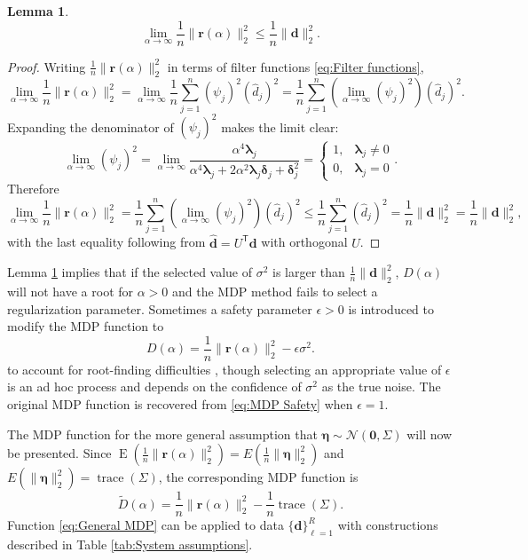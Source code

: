 \documentclass[12pt]{article}
\newcommand{\dVec}{\mathbf{d}}	%
\newcommand{\rVec}{\mathbf{r}}	%
\newcommand{\trans}[1]{{#1}^\mathsf{T}}	%
\DeclareMathOperator{\trace}{trace}		%
\newcommand{\dft}[1]{\widehat{#1}}	%
\newcommand{\regparam}{\alpha}  %
\newcommand{\mfilt}{\psi}
\newcommand{\noise}{\eta}	%
\newcommand{\noiseSD}{\sigma}	%
\newcommand{\noiseVec}{\bm{\noise}}	%
\DeclareMathOperator{\E}{E}	%
\newcommand{\zeroVec}{\bm{0}}	%
\newcommand{\svd}[1]{\widehat{#1}}	%
\newcommand{\D}{D}	%
\newcommand{\safeparam}{\epsilon}	%
\newtheorem{lemma}{Lemma}[section]
\begin{document}
\begin{lemma}
\label{lem:Residual limit}
\[\lim_{\regparam\rightarrow\infty} \frac{1}{n}\|\rVec(\regparam)\|_2^2 \leq \frac{1}{n}\|\dVec\|_2^2.\]
\end{lemma}
\begin{proof}
Writing $\frac{1}{n}\|\rVec(\regparam)\|_2^2$ in terms of filter functions \eqref{eq:Filter functions},
\[\lim_{\regparam\rightarrow\infty} \frac{1}{n}\|\rVec(\regparam)\|_2^2 = \lim_{\regparam\rightarrow\infty} \frac{1}{n} \sum_{j=1}^{n} \left(\mfilt_j\right)^2\left(\dft{d}_j\right)^2 = \frac{1}{n} \sum_{j=1}^{n} \left(\lim_{\regparam\rightarrow\infty}\left(\mfilt_j\right)^2\right)\left(\dft{d}_j\right)^2.\]
Expanding the denominator of $\left(\mfilt_j\right)^2$ makes the limit clear:
\[\lim_{\regparam\rightarrow\infty} \left(\mfilt_j\right)^2 = \lim_{\regparam\rightarrow\infty}\frac{\regparam^4\bm{\lambda}_j}{\regparam^4\bm{\lambda}_j + 2\regparam^2\bm{\lambda}_j\bm{\delta}_j + \bm{\delta}_j^2} = \begin{cases}
1, & \bm{\lambda}_j \neq 0 \\
0, & \bm{\lambda}_j = 0
\end{cases}.\]
Therefore
\[\lim_{\regparam\rightarrow\infty} \frac{1}{n}\|\rVec(\regparam)\|_2^2 = \frac{1}{n} \sum_{j=1}^{n} \left(\lim_{\regparam\rightarrow\infty}\left(\mfilt_j\right)^2\right)\left(\dft{d}_j\right)^2 \leq \frac{1}{n} \sum_{j=1}^{n} \left(\dft{d}_j\right)^2 = \frac{1}{n}\|\svd{\dVec}\|_2^2 = \frac{1}{n}\|\dVec\|_2^2,\]
with the last equality following from $\svd{\dVec} = \trans{U}\dVec$ with orthogonal $U$.
\end{proof}
\noindent Lemma \ref{lem:Residual limit} implies that if the selected value of $\noiseSD^2$ is larger than $\frac{1}{n}\|\dVec\|_2^2$, $\D(\regparam)$ will not have a root for $\regparam > 0$ and the MDP method fails to select a regularization parameter. Sometimes a safety parameter $\safeparam > 0$ is introduced to modify the MDP function to
\begin{equation}
\label{eq:MDP Safety}
\D(\regparam) = \frac{1}{n}\|\rVec(\regparam)\|_2^2 - \safeparam\noiseSD^2.
\end{equation}
to account for root-finding difficulties \cite{ABT,IRTools}, though selecting an appropriate value of $\safeparam$ is an ad hoc process and depends on the confidence of $\noiseSD^2$ as the true noise. The original MDP function is recovered from \eqref{eq:MDP Safety} when $\safeparam = 1$. \par
The MDP function for the more general assumption that $\noiseVec \sim \mathcal{N}(\zeroVec,\Sigma)$ will now be presented. Since $\E(\frac{1}{n}\|\rVec(\regparam)\|_2^2) = E(\frac{1}{n}\|\noiseVec\|_2^2)$ and $E(\|\noiseVec\|_2^2) = \trace(\Sigma)$, the corresponding MDP function is
\begin{equation}
\label{eq:General MDP}
\widetilde{\D}(\regparam) = \frac{1}{n}\|\rVec(\regparam)\|_2^2 - \frac{1}{n}\trace\left(\Sigma\right).
\end{equation}
Function \eqref{eq:General MDP} can be applied to data $\{\dVec\}_{\ell=1}^R$ with constructions described in Table \ref{tab:System assumptions}. 
\end{document}

